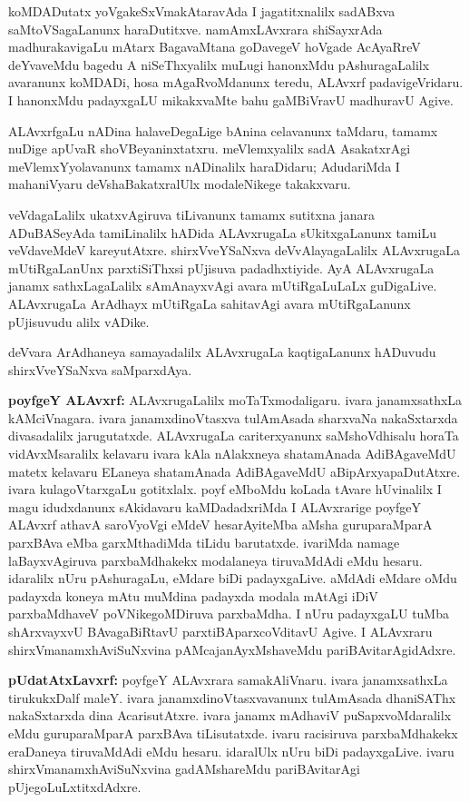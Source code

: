 koMDADutatx yoVgakeSxVmakAtaravAda I jagatitxnalilx sadABxva saMtoVSagaLanunx haraDutitxve. namAmxLAvxrara shiSayxrAda madhurakavigaLu mAtarx BagavaMtana goDavegeV hoVgade AcAyaRreV deYvaveMdu bagedu A niSeThxyalilx muLugi hanonxMdu pAshuragaLalilx avaranunx koMDADi, hosa mAgaRvoMdanunx teredu, ALAvxrf padavigeVridaru. I hanonxMdu padayxgaLU mikakxvaMte bahu gaMBiVravU madhuravU Agive.

ALAvxrfgaLu nADina halaveDegaLige bAnina celavanunx taMdaru, tamamx nuDige apUvaR shoVBeyaninxtatxru. meVlemxyalilx sadA AsakatxrAgi meVlemxYyolavanunx tamamx nADinalilx haraDidaru; AdudariMda I mahaniVyaru deVshaBakatxralUlx modaleNikege takakxvaru.

veVdagaLalilx ukatxvAgiruva tiLivanunx tamamx sutitxna janara ADuBASeyAda tamiLinalilx hADida ALAvxrugaLa sUkitxgaLanunx tamiLu veVdaveMdeV kareyutAtxre. shirxVveYSaNxva deVvAlayagaLalilx ALAvxrugaLa mUtiRgaLanUnx parxtiSiThxsi pUjisuva padadhxtiyide. AyA ALAvxrugaLa janamx sathxLagaLalilx sAmAnayxvAgi avara mUtiRgaLuLaLx guDigaLive. ALAvxrugaLa ArAdhayx mUtiRgaLa sahitavAgi avara mUtiRgaLanunx pUjisuvudu alilx vADike.

deVvara ArAdhaneya samayadalilx ALAvxrugaLa kaqtigaLanunx hADuvudu shirxVveYSaNxva saMparxdAya.

{\textbf {poyfgeY ALAvxrf:}} ALAvxrugaLalilx moTaTxmodaligaru. ivara janamxsathxLa kAMciVnagara. ivara janamxdinoVtasxva tulAmAsada sharxvaNa nakaSxtarxda divasadalilx jarugutatxde. ALAvxrugaLa cariterxyanunx saMshoVdhisalu horaTa vidAvxMsaralilx kelavaru ivara kAla nAlakxneya shatamAnada AdiBAgaveMdU matetx kelavaru ELaneya shatamAnada AdiBAgaveMdU aBipArxyapaDutAtxre. ivara kulagoVtarxgaLu gotitxlalx. poyf eMboMdu koLada tAvare hUvinalilx I magu idudxdanunx sAkidavaru kaMDadadxriMda I ALAvxrarige poyfgeY ALAvxrf athavA saroVyoVgi eMdeV hesarAyiteMba aMsha guruparaMparA parxBAva eMba garxMthadiMda tiLidu barutatxde. ivariMda namage laBayxvAgiruva parxbaMdhakekx modalaneya tiruvaMdAdi eMdu hesaru. idaralilx nUru pAshuragaLu, eMdare biDi padayxgaLive. aMdAdi eMdare oMdu padayxda koneya mAtu muMdina padayxda modala mAtAgi iDiV parxbaMdhaveV poVNikegoMDiruva parxbaMdha. I nUru padayxgaLU tuMba shArxvayxvU BAvagaBiRtavU parxtiBAparxcoVditavU Agive. I ALAvxraru shirxVmanamxhAviSuNxvina pAMcajanAyxMshaveMdu pariBAvitarAgidAdxre.

{\textbf {pUdatAtxLavxrf:}} poyfgeY ALAvxrara samakAliVnaru. ivara janamxsathxLa tirukukxDalf maleY. ivara janamxdinoVtasxvavanunx tulAmAsada dhaniSAThx nakaSxtarxda dina AcarisutAtxre. ivara janamx mAdhaviV puSapxvoMdaralilx eMdu guruparaMparA parxBAva tiLisutatxde. ivaru racisiruva parxbaMdhakekx eraDaneya tiruvaMdAdi eMdu hesaru. idaralUlx nUru biDi padayxgaLive. ivaru shirxVmanamxhAviSuNxvina gadAMshareMdu pariBAvitarAgi pUjegoLuLxtitxdAdxre.

